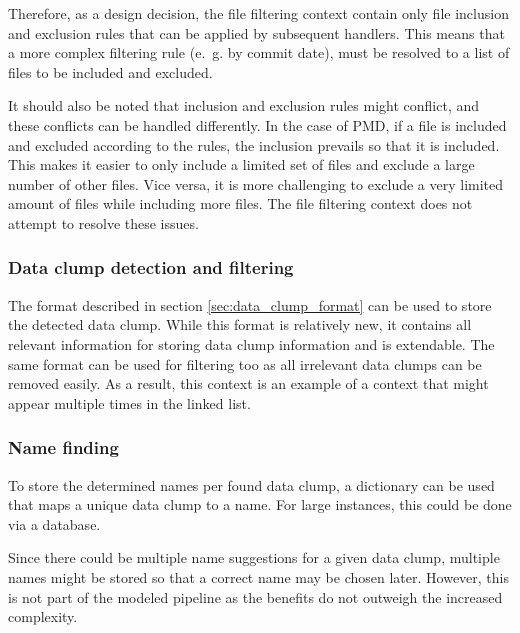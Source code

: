 Therefore, as a design decision, the file filtering context contain only file inclusion and exclusion rules that can be applied by subsequent handlers. This means that a more complex filtering rule (e.~g. by commit date), must be resolved to a list of files to be included and excluded. 

It should also be noted that inclusion and exclusion rules might conflict, and these conflicts can be handled differently. In the case of PMD, if a file is included and excluded according to the rules, the inclusion prevails so that it is included. This makes it easier to only include a limited set of files and exclude a large number of other files. Vice versa, it is more challenging to exclude a very limited amount of files while including more files. The file filtering context does not attempt to resolve these issues. 

\begin{comment}
\subsubsection{Extraction of AST}
\end{comment}
\subsubsection{Data clump detection and filtering}

The format described in section \ref{sec:data_clump_format} can be used to store the detected data clump. While this format is relatively new, it contains all relevant information for storing data clump information and is extendable. The same format can be used for filtering too as all irrelevant data clumps can be removed easily. As a result, this context is an example of a context that might appear multiple times in the linked list. 

\subsubsection{Name finding}
To store the determined names per found data clump, a dictionary can be used that maps a unique data clump to a name. For large instances, this could be done via a database. 

Since there could be multiple name suggestions for a given data clump, multiple names might be stored so that a correct name may be chosen later. However, this is not part of the modeled pipeline as the benefits do not outweigh the increased complexity.

